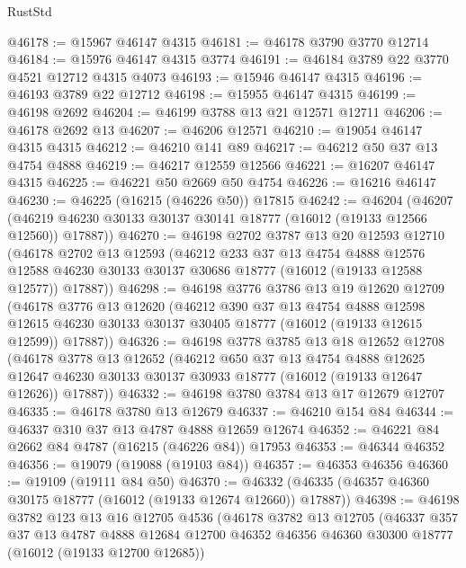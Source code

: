 \begin{lexlean}{RustStd}
\begin{coremodule}
@46178 := @15967 @46147 @4315
@46181 := @46178 @3790 @3770 @12714
@46184 := @15976 @46147 @4315 @3774
@46191 := @46184 @3789 @22 @3770 @4521 @12712 @4315 @4073
@46193 := @15946 @46147 @4315
@46196 := @46193 @3789 @22 @12712
@46198 := @15955 @46147 @4315
@46199 := @46198 @2692
@46204 := @46199 @3788 @13 @21 @12571 @12711
@46206 := @46178 @2692 @13
@46207 := @46206 @12571
@46210 := @19054 @46147 @4315 @4315
@46212 := @46210 @141 @89
@46217 := @46212 @50 @37 @13 @4754 @4888
@46219 := @46217 @12559 @12566
@46221 := @16207 @46147 @4315
@46225 := @46221 @50 @2669 @50 @4754
@46226 := @16216 @46147
@46230 := @46225 (@16215 (@46226 @50)) @17815
@46242 := @46204
    (@46207 (@46219 @46230 @30133 @30137 @30141 @18777 (@16012 (@19133 @12566 @12560)) @17887))
@46270 := @46198
    @2702
    @3787
    @13
    @20
    @12593
    @12710
    (@46178
      @2702
      @13
      @12593
      (@46212
        @233
        @37
        @13
        @4754
        @4888
        @12576
        @12588
        @46230
        @30133
        @30137
        @30686
        @18777
        (@16012 (@19133 @12588 @12577))
        @17887))
@46298 := @46198
    @3776
    @3786
    @13
    @19
    @12620
    @12709
    (@46178
      @3776
      @13
      @12620
      (@46212
        @390
        @37
        @13
        @4754
        @4888
        @12598
        @12615
        @46230
        @30133
        @30137
        @30405
        @18777
        (@16012 (@19133 @12615 @12599))
        @17887))
@46326 := @46198
    @3778
    @3785
    @13
    @18
    @12652
    @12708
    (@46178
      @3778
      @13
      @12652
      (@46212
        @650
        @37
        @13
        @4754
        @4888
        @12625
        @12647
        @46230
        @30133
        @30137
        @30933
        @18777
        (@16012 (@19133 @12647 @12626))
        @17887))
@46332 := @46198 @3780 @3784 @13 @17 @12679 @12707
@46335 := @46178 @3780 @13 @12679
@46337 := @46210 @154 @84
@46344 := @46337 @310 @37 @13 @4787 @4888 @12659 @12674
@46352 := @46221 @84 @2662 @84 @4787 (@16215 (@46226 @84)) @17953
@46353 := @46344 @46352
@46356 := @19079 (@19088 (@19103 @84))
@46357 := @46353 @46356
@46360 := @19109 (@19111 @84 @50)
@46370 := @46332 (@46335 (@46357 @46360 @30175 @18777 (@16012 (@19133 @12674 @12660)) @17887))
@46398 := @46198
    @3782
    @123
    @13
    @16
    @12705
    @4536
    (@46178
      @3782
      @13
      @12705
      (@46337
        @357
        @37
        @13
        @4787
        @4888
        @12684
        @12700
        @46352
        @46356
        @46360
        @30300
        @18777
        (@16012 (@19133 @12700 @12685))

\end{coremodule}
\end{lexlean}
